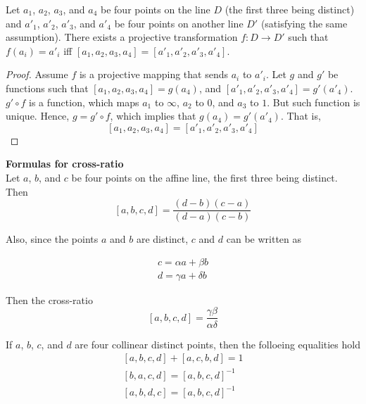 \begin{prop}
  Let $a_1$, $a_2$, $a_3$, and $a_4$ be four points on the line $D$ (the first three being
  distinct) and $a'_1$, $a'_2$, $a'_3$, and $a'_4$ be four points on another line $D'$
  (satisfying the same assumption). There exists a projective transformation $f:D\rightarrow D'$
  such that $f(a_i)=a'_i$ iff $[a_1,a_2,a_3,a_4]=[a'_1,a'_2,a'_3,a'_4]$.
\end{prop}

\begin{proof}
  Assume $f$ is a projective mapping that sends $a_i$ to $a'_i$. Let $g$ and $g'$ be functions
  such that $[a_1,a_2,a_3,a_4]=g(a_4)$, and $[a'_1,a'_2,a'_3,a'_4]=g'(a'_4)$. $g'\circ f$ is a
  function, which maps $a_1$ to $\infty$, $a_2$ to $0$, and $a_3$ to $1$. But such function is
  unique. Hence, $g=g'\circ f$, which implies that $g(a_4)=g'(a'_4)$. That is,
  \[
    [a_1,a_2,a_3,a_4]=[a'_1,a'_2,a'_3,a'_4]
  \]
\end{proof}

\begin{remark} \textbf{Formulas for cross-ratio}\\
  Let $a$, $b$, and $c$ be four points on the affine line, the first three being distinct. Then
  \[
    [a,b,c,d]=\frac{(d-b)(c-a)}{(d-a)(c-b)}
  \]

  Also, since the points $a$ and $b$ are distinct, $c$ and $d$ can be written as

  \begin{eqnarray*}
    c=\alpha a+\beta b \\
    d=\gamma a+\delta b
  \end{eqnarray*}

  Then the cross-ratio
  \[
    [a,b,c,d]=\frac{\gamma\beta}{\alpha\delta}
  \]
\end{remark}

\begin{prop}
  If $a$, $b$, $c$, and $d$ are four collinear distinct points, then the folloeing equalities
  hold
  \begin{eqnarray*}
    \left[a,b,c,d\right]+\left[a,c,b,d\right]=1 \\
    \left[b,a,c,d\right]=\left[a,b,c,d\right]^{-1} \\
    \left[a,b,d,c\right]=\left[a,b,c,d\right]^{-1}
  \end{eqnarray*}
\end{prop}

